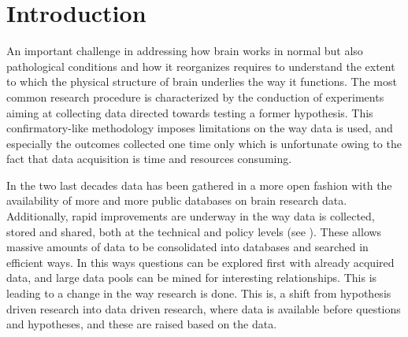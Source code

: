 \documentclass[utf8,paper]{frontiersSCNS} %
\begin{document}




\section{Introduction}

An important challenge in addressing how brain works in normal but also pathological conditions and how it reorganizes  requires to understand the extent to which the physical structure of brain underlies the way it functions. The most common research procedure is characterized by the conduction of experiments aiming at collecting data directed towards testing a former hypothesis. This  confirmatory-like methodology imposes limitations on the way data is used, and especially the outcomes collected one time only which is unfortunate owing to the fact that data acquisition is time and resources consuming.

										
In the two last decades data has been gathered in a more open fashion with the availability of more and more public databases on brain research data. Additionally, rapid improvements are underway in the way data is collected, stored and shared, both at the technical and policy levels (see \cite{eckersley_neuroscience_2003}). These allows massive amounts of data to be consolidated into databases and searched in efficient ways. In this ways questions can be explored first with already acquired data, and large data pools can be mined for interesting relationships. This is leading to a change in the way research is done. This is, a shift from hypothesis driven research into data driven research, where data is available before questions and hypotheses, and these are  raised based on the data.
				
\end{document}
